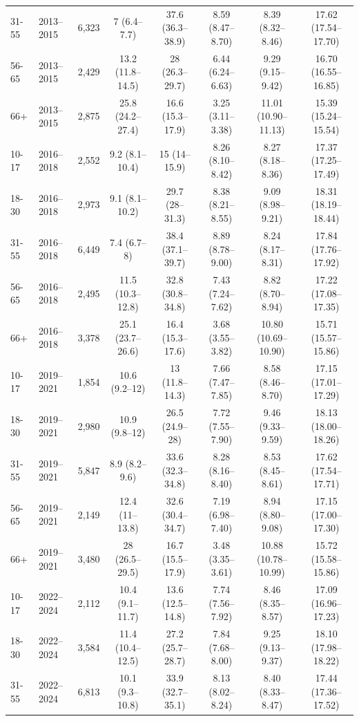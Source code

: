 \begin{table}[!htbp]
\begin{threeparttable}
\begin{tabular}{l l r c c c c c}
31-55 & 2013--2015 & 6,323 & 7 (6.4--7.7) & 37.6 (36.3--38.9) & 8.59 (8.47--8.70) & 8.39 (8.32--8.46) & 17.62 (17.54--17.70) \\
56-65 & 2013--2015 & 2,429 & 13.2 (11.8--14.5) & 28 (26.3--29.7) & 6.44 (6.24--6.63) & 9.29 (9.15--9.42) & 16.70 (16.55--16.85) \\
66+ & 2013--2015 & 2,875 & 25.8 (24.2--27.4) & 16.6 (15.3--17.9) & 3.25 (3.11--3.38) & 11.01 (10.90--11.13) & 15.39 (15.24--15.54) \\
10-17 & 2016--2018 & 2,552 & 9.2 (8.1--10.4) & 15 (14--15.9) & 8.26 (8.10--8.42) & 8.27 (8.18--8.36) & 17.37 (17.25--17.49) \\
18-30 & 2016--2018 & 2,973 & 9.1 (8.1--10.2) & 29.7 (28--31.3) & 8.38 (8.21--8.55) & 9.09 (8.98--9.21) & 18.31 (18.19--18.44) \\
31-55 & 2016--2018 & 6,449 & 7.4 (6.7--8) & 38.4 (37.1--39.7) & 8.89 (8.78--9.00) & 8.24 (8.17--8.31) & 17.84 (17.76--17.92) \\
56-65 & 2016--2018 & 2,495 & 11.5 (10.3--12.8) & 32.8 (30.8--34.8) & 7.43 (7.24--7.62) & 8.82 (8.70--8.94) & 17.22 (17.08--17.35) \\
66+ & 2016--2018 & 3,378 & 25.1 (23.7--26.6) & 16.4 (15.3--17.6) & 3.68 (3.55--3.82) & 10.80 (10.69--10.90) & 15.71 (15.57--15.86) \\
10-17 & 2019--2021 & 1,854 & 10.6 (9.2--12) & 13 (11.8--14.3) & 7.66 (7.47--7.85) & 8.58 (8.46--8.70) & 17.15 (17.01--17.29) \\
18-30 & 2019--2021 & 2,980 & 10.9 (9.8--12) & 26.5 (24.9--28) & 7.72 (7.55--7.90) & 9.46 (9.33--9.59) & 18.13 (18.00--18.26) \\
31-55 & 2019--2021 & 5,847 & 8.9 (8.2--9.6) & 33.6 (32.3--34.8) & 8.28 (8.16--8.40) & 8.53 (8.45--8.61) & 17.62 (17.54--17.71) \\
56-65 & 2019--2021 & 2,149 & 12.4 (11--13.8) & 32.6 (30.4--34.7) & 7.19 (6.98--7.40) & 8.94 (8.80--9.08) & 17.15 (17.00--17.30) \\
66+ & 2019--2021 & 3,480 & 28 (26.5--29.5) & 16.7 (15.5--17.9) & 3.48 (3.35--3.61) & 10.88 (10.78--10.99) & 15.72 (15.58--15.86) \\
10-17 & 2022--2024 & 2,112 & 10.4 (9.1--11.7) & 13.6 (12.5--14.8) & 7.74 (7.56--7.92) & 8.46 (8.35--8.57) & 17.09 (16.96--17.23) \\
18-30 & 2022--2024 & 3,584 & 11.4 (10.4--12.5) & 27.2 (25.7--28.7) & 7.84 (7.68--8.00) & 9.25 (9.13--9.37) & 18.10 (17.98--18.22) \\
31-55 & 2022--2024 & 6,813 & 10.1 (9.3--10.8) & 33.9 (32.7--35.1) & 8.13 (8.02--8.24) & 8.40 (8.33--8.47) & 17.44 (17.36--17.52) \\

\end{tabular}
\end{threeparttable}
\end{table}
